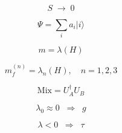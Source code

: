 \documentclass[12pt]{article}
\begin{document}

\[
S \;\to\; 0
\]

\[
\Psi = \sum_i a_i |i\rangle
\]

\[
m = \lambda(H)
\]

\[
m^{(n)}_f = \lambda_n(H), \quad n=1,2,3
\]

\[
\mathrm{Mix} = U_A^\dagger U_B
\]

\[
\lambda_0 \approx 0 \;\;\Rightarrow\;\; g
\]

\[
\lambda < 0 \;\;\Rightarrow\;\; \tau
\]
\end{document}
